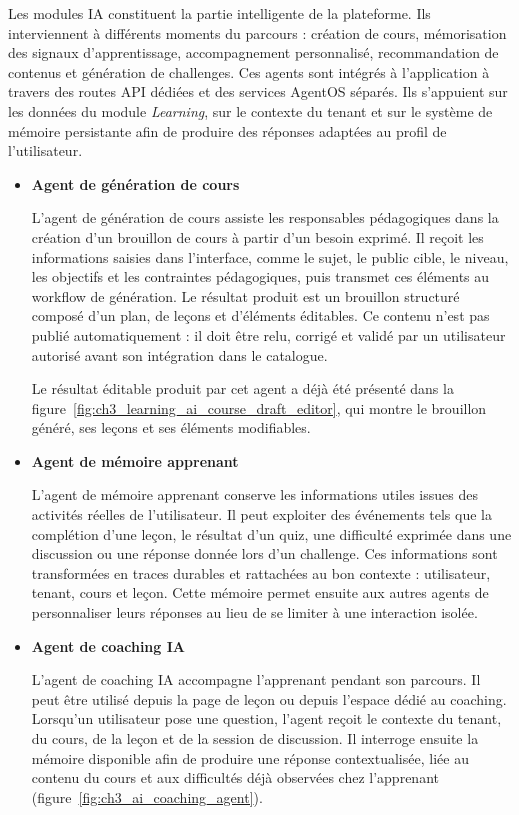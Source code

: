 Les modules IA constituent la partie intelligente de la plateforme. Ils interviennent à différents moments du parcours : création de cours, mémorisation des signaux d'apprentissage, accompagnement personnalisé, recommandation de contenus et génération de challenges. Ces agents sont intégrés à l'application à travers des routes API dédiées et des services AgentOS séparés. Ils s'appuient sur les données du module \textit{Learning}, sur le contexte du tenant et sur le système de mémoire persistante afin de produire des réponses adaptées au profil de l'utilisateur.

\begin{itemize}
    \item \textbf{Agent de génération de cours}

    L'agent de génération de cours assiste les responsables pédagogiques dans la création d'un brouillon de cours à partir d'un besoin exprimé. Il reçoit les informations saisies dans l'interface, comme le sujet, le public cible, le niveau, les objectifs et les contraintes pédagogiques, puis transmet ces éléments au workflow de génération. Le résultat produit est un brouillon structuré composé d'un plan, de leçons et d'éléments éditables. Ce contenu n'est pas publié automatiquement : il doit être relu, corrigé et validé par un utilisateur autorisé avant son intégration dans le catalogue.

    Le résultat éditable produit par cet agent a déjà été présenté dans la figure~\ref{fig:ch3_learning_ai_course_draft_editor}, qui montre le brouillon généré, ses leçons et ses éléments modifiables.

    \item \textbf{Agent de mémoire apprenant}

    L'agent de mémoire apprenant conserve les informations utiles issues des activités réelles de l'utilisateur. Il peut exploiter des événements tels que la complétion d'une leçon, le résultat d'un quiz, une difficulté exprimée dans une discussion ou une réponse donnée lors d'un challenge. Ces informations sont transformées en traces durables et rattachées au bon contexte : utilisateur, tenant, cours et leçon. Cette mémoire permet ensuite aux autres agents de personnaliser leurs réponses au lieu de se limiter à une interaction isolée.

    \item \textbf{Agent de coaching IA}

    L'agent de coaching IA accompagne l'apprenant pendant son parcours. Il peut être utilisé depuis la page de leçon ou depuis l'espace dédié au coaching. Lorsqu'un utilisateur pose une question, l'agent reçoit le contexte du tenant, du cours, de la leçon et de la session de discussion. Il interroge ensuite la mémoire disponible afin de produire une réponse contextualisée, liée au contenu du cours et aux difficultés déjà observées chez l'apprenant (figure~\ref{fig:ch3_ai_coaching_agent}).


\end{itemize}
